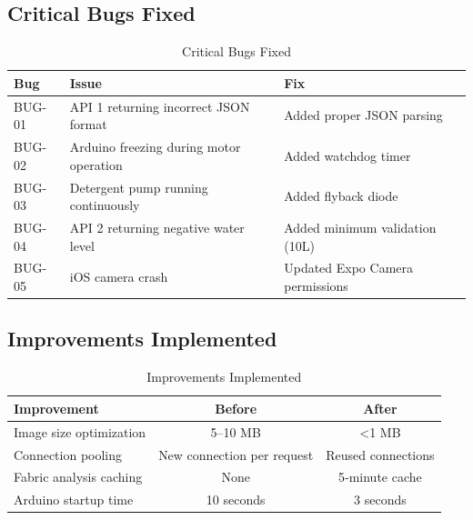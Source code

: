 \subsection{Critical Bugs Fixed}
\begin{table}[H]
    \centering
    \begin{tabular}{|l|l|l|}
        \hline
        \textbf{Bug} & \textbf{Issue} & \textbf{Fix} \\
        \hline
        BUG-01 & API 1 returning incorrect JSON format & Added proper JSON parsing \\
        \hline
        BUG-02 & Arduino freezing during motor operation & Added watchdog timer \\
        \hline
        BUG-03 & Detergent pump running continuously & Added flyback diode \\
        \hline
        BUG-04 & API 2 returning negative water level & Added minimum validation (10L) \\
        \hline
        BUG-05 & iOS camera crash & Updated Expo Camera permissions \\
        \hline
    \end{tabular}
    \caption{Critical Bugs Fixed}
    \label{tab:bugs}
\end{table}

\subsection{Improvements Implemented}
\begin{table}[H]
    \centering
    \begin{tabular}{|l|c|c|}
        \hline
        \textbf{Improvement} & \textbf{Before} & \textbf{After} \\
        \hline
        Image size optimization & 5–10 MB & <1 MB \\
        \hline
        Connection pooling & New connection per request & Reused connections \\
        \hline
        Fabric analysis caching & None & 5‑minute cache \\
        \hline
        Arduino startup time & 10 seconds & 3 seconds \\
        \hline
    \end{tabular}
    \caption{Improvements Implemented}
    \label{tab:improvements}
\end{table}


